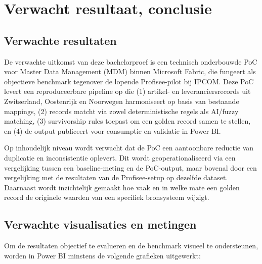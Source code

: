 \section{Verwacht resultaat, conclusie}%
\label{sec:verwachte_resultaten}

\subsection{Verwachte resultaten}
De verwachte uitkomst van deze bachelorproef is een technisch onderbouwde PoC voor Master Data Management (MDM) binnen Microsoft Fabric, die fungeert als objectieve benchmark tegenover de lopende Profisee-pilot bij IPCOM. Deze PoC levert een reproduceerbare pipeline op die (1) artikel- en leveranciersrecords uit Zwitserland, Oostenrijk en Noorwegen harmoniseert op basis van bestaande mappings, (2) records matcht via zowel deterministische regels als AI/fuzzy matching, (3) survivorship rules toepast om een golden record samen te stellen, en (4) de output publiceert voor consumptie en validatie in Power BI. 

Op inhoudelijk niveau wordt verwacht dat de PoC een aantoonbare reductie van duplicatie en inconsistentie oplevert. Dit wordt geoperationaliseerd via een vergelijking tussen een baseline-meting en de PoC-output, maar bovenal door een vergelijking met de resultaten van de Profisee-setup op dezelfde dataset. Daarnaast wordt inzichtelijk gemaakt hoe vaak en in welke mate een golden record de originele waarden van een specifiek bronsysteem wijzigt.

\subsection{Verwachte visualisaties en metingen}
Om de resultaten objectief te evalueren en de benchmark visueel te ondersteunen, worden in Power BI minstens de volgende grafieken uitgewerkt:

